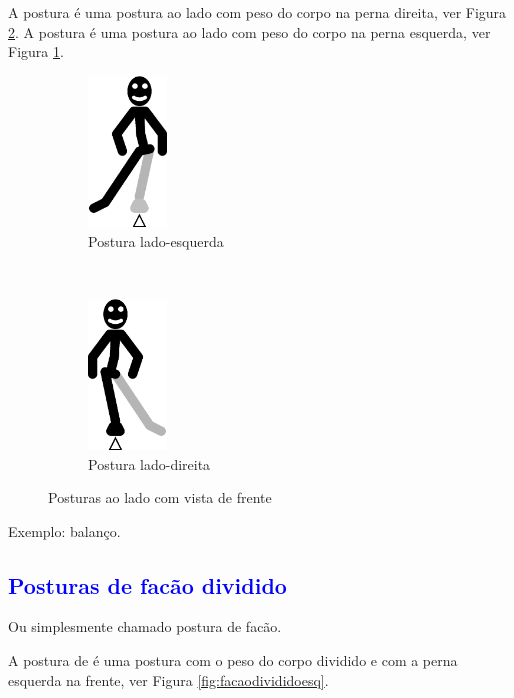 A postura  é uma postura ao lado com peso do corpo na perna direita, ver Figura \ref{fig:ladodireita}.
A postura  é uma postura ao lado com peso do corpo na perna esquerda, ver Figura \ref{fig:ladoesquerda}.
\begin{figure}[H]
    \centering
    \begin{subfigure}[b]{0.3\textwidth}
        \includegraphics[height=4cm]{chapters/cap-posturas/postura-lateral-esq.eps}
        \caption{Postura lado-esquerda}
        \label{fig:ladoesquerda}
    \end{subfigure}
    ~ %
    \begin{subfigure}[b]{0.3\textwidth}
        \includegraphics[height=4cm]{chapters/cap-posturas/postura-lateral-der.eps}
        \caption{Postura lado-direita}
        \label{fig:ladodireita}
    \end{subfigure}      
    \caption{Posturas ao lado  com vista de frente}\label{fig:ladoderesq}
\end{figure}


Exemplo: balanço.

\subsection{\textcolor{blue}{ Posturas de facão dividido}}
Ou simplesmente chamado postura de facão.

A postura  de  é uma postura com o peso do corpo dividido e com a perna esquerda na frente, ver Figura \ref{fig:facaodivididoesq}.

